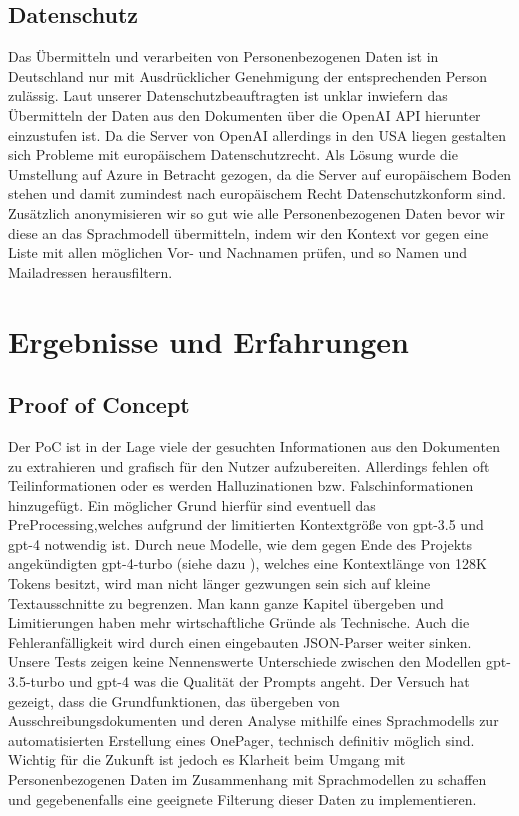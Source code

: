 \subsection{Datenschutz}
Das Übermitteln und verarbeiten von Personenbezogenen Daten ist in Deutschland nur mit Ausdrücklicher Genehmigung der
entsprechenden Person zulässig. Laut unserer Datenschutzbeauftragten ist unklar inwiefern das Übermitteln der Daten aus
den Dokumenten über die OpenAI API hierunter einzustufen ist. Da die Server von OpenAI allerdings in den USA liegen
gestalten sich Probleme mit europäischem Datenschutzrecht. Als Lösung wurde die Umstellung auf Azure in Betracht
gezogen, da die Server auf europäischem Boden stehen und damit zumindest nach europäischem Recht Datenschutzkonform
sind. Zusätzlich anonymisieren wir so gut wie alle Personenbezogenen Daten bevor wir diese an das Sprachmodell
übermitteln, indem wir den Kontext vor gegen eine Liste mit allen möglichen Vor- und Nachnamen prüfen, 
und so Namen und Mailadressen herausfiltern.


\section{Ergebnisse und Erfahrungen}

\subsection{Proof of Concept}

Der PoC ist in der Lage viele der gesuchten Informationen aus den Dokumenten zu extrahieren und grafisch für den Nutzer
aufzubereiten. Allerdings fehlen oft Teilinformationen oder es werden Halluzinationen bzw. Falschinformationen
hinzugefügt. Ein möglicher Grund hierfür sind eventuell das PreProcessing,welches aufgrund der limitierten Kontextgröße
von gpt-3.5 und gpt-4 notwendig ist. Durch neue Modelle, wie dem gegen Ende des Projekts angekündigten gpt-4-turbo
(siehe dazu \textcite{gpt-4-turbo}), welches eine Kontextlänge von 128K Tokens besitzt, wird man nicht länger gezwungen
sein sich auf kleine Textausschnitte zu begrenzen. Man kann ganze Kapitel übergeben und Limitierungen haben mehr
wirtschaftliche Gründe als Technische. Auch die Fehleranfälligkeit wird durch einen eingebauten JSON-Parser weiter
sinken. Unsere Tests zeigen keine Nennenswerte Unterschiede zwischen den Modellen gpt-3.5-turbo und gpt-4 was die
Qualität der Prompts angeht. Der Versuch hat gezeigt, dass die Grundfunktionen, das übergeben von
Ausschreibungsdokumenten und deren Analyse mithilfe eines Sprachmodells zur automatisierten Erstellung eines OnePager,
technisch definitiv möglich sind. Wichtig für die Zukunft ist jedoch es Klarheit beim Umgang mit Personenbezogenen Daten
im Zusammenhang mit Sprachmodellen zu schaffen und gegebenenfalls eine geeignete Filterung dieser Daten zu
implementieren.

